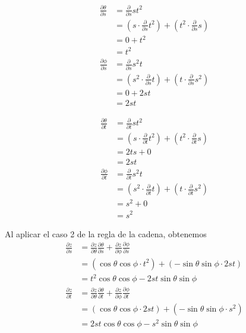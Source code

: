 \documentclass[12pt]{article}
\begin{document}
\begin{align*}
  \frac{\partial \theta}{\partial s}
  &= \frac{\partial}{\partial s} st^2 \\
  &= \left(s\cdot\frac{\partial}{\partial s} t^2\right) + \left(t^2\cdot\frac{\partial}{\partial s}s\right) \\
  &= 0 + t^2 \\
  &= t^2 \\
  \frac{\partial \phi}{\partial s}
  &= \frac{\partial}{\partial s} s^2t \\
  &= \left(s^2\cdot\frac{\partial}{\partial s}t\right)+\left(t\cdot\frac{\partial}{\partial s}s^2\right) \\
  &= 0 + 2st \\
  &= 2st
\end{align*}

\begin{align*}
  \frac{\partial \theta}{\partial t}
  &= \frac{\partial}{\partial t} st^2 \\
  &= \left(s\cdot\frac{\partial}{\partial t}t^2\right) +\left(t^2\cdot\frac{\partial}{\partial t}s\right) \\
  &= 2ts + 0 \\
  &= 2st\\
  \frac{\partial \phi}{\partial t}
  &= \frac{\partial}{\partial t} s^2t \\
  &= \left(s^2\cdot\frac{\partial}{\partial t}t\right) + \left(t\cdot\frac{\partial}{\partial t}s^2\right) \\
  &= s^2 + 0 \\
  &= s^2
\end{align*}

Al aplicar el caso 2 de la regla de la cadena, obtenemos
\begin{align*}
  \frac{\partial z}{\partial s}
  &= \frac{\partial z}{\partial \theta}\frac{\partial \theta}{\partial s} + \frac{\partial z}{\partial \phi}\frac{\partial \phi}{\partial s} \\
  &=  (\cos{\theta}\cos{\phi} \cdot t^2) + (-\sin{\theta}\sin{\phi} \cdot 2st) \\
  &= t^2\cos{\theta}\cos{\phi} - 2st\sin{\theta}\sin{\phi} \\
  \frac{\partial z}{\partial t}
  &= \frac{\partial z}{\partial \theta}\frac{\partial \theta}{\partial t} + \frac{\partial z}{\partial \phi}\frac{\partial \phi}{\partial t} \\
  &=  (\cos{\theta}\cos{\phi} \cdot 2st) + (-\sin{\theta}\sin{\phi} \cdot s^2) \\
  &= 2st\cos{\theta}\cos{\phi} - s^2\sin{\theta}\sin{\phi}
\end{align*}
\end{document}
